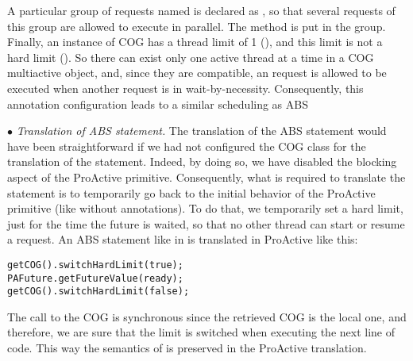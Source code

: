 A particular group of requests named  is declared as , so that several requests of this group are allowed to execute in parallel.
The  method is put in the  group.
Finally, an instance of COG has a thread limit of 1 (), and this limit is not a hard limit (). So there can exist only one active thread at a time in a COG multiactive object, and, since they are compatible, an  request is allowed to be executed when another  request is in wait-by-necessity. Consequently, this annotation configuration leads to a similar scheduling as ABS
	
\smallskip
$\bullet$ \textit{Translation of ABS  statement.}
The translation of the ABS  statement would have been straightforward if we had not configured the COG class for the translation of the  statement. Indeed, by doing so, we have disabled the blocking aspect of the ProActive  primitive. 
Consequently, what is required to translate the  statement is to temporarily go back to the initial behavior of the ProActive  primitive (like without annotations).
To do that, we temporarily set a hard limit, just for the time the future is waited, so that no other thread can start or resume a request. An ABS  statement like in  is translated in ProActive like this:
\begin{lstlisting}
getCOG().switchHardLimit(true);
PAFuture.getFutureValue(ready);  
getCOG().switchHardLimit(false);
\end{lstlisting}
The call to the COG is synchronous since the retrieved COG is the local one, and therefore, we are sure that the limit is switched when executing the next line of code. This way the semantics of  is preserved in the ProActive translation.

